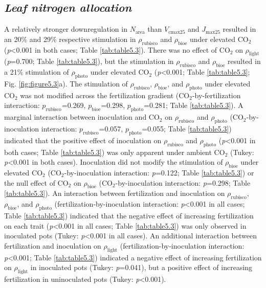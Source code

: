 \subsection{\textit{Leaf nitrogen allocation}}
\noindent A relatively stronger downregulation in $N_\mathrm{area}$ than $V_\mathrm{cmax25}$ and $J_\mathrm{max25}$ resulted in an 20\% and 29\% respective stimulation in $\rho_\mathrm{rubisco}$ and $\rho_\mathrm{bioe}$ under elevated CO$_2$ (\textit{p}<0.001 in both cases; Table \ref{tab:table5.3}). There was no effect of CO$_2$ on $\rho_\mathrm{light}$ (\textit{p}=0.700; Table \ref{tab:table5.3}), but the stimulation in $\rho_\mathrm{rubisco}$ and $\rho_\mathrm{bioe}$ resulted in a 21\% stimulation of $\rho_\mathrm{photo}$ under elevated CO$_2$ (\textit{p}<0.001; Table \ref{tab:table5.3}; Fig. \ref{fig:figure5.3}a). The stimulation of $\rho_\mathrm{rubisco}$, $\rho_\mathrm{bioe}$, and $\rho_\mathrm{photo}$ under elevated CO$_2$ was not modified across the fertilization gradient (CO$_2$-by-fertilization interaction: $p_\mathrm{rubisco}$=0.269, $p_\mathrm{bioe}$=0.298, $p_\mathrm{photo}$=0.281; Table \ref{tab:table5.3}). A marginal interaction between inoculation and CO$_2$ on $\rho_\mathrm{rubisco}$ and $\rho_\mathrm{photo}$ (CO$_2$-by-inoculation interaction: $p_\mathrm{rubisco}$=0.057, $p_\mathrm{photo}$=0.055; Table \ref{tab:table5.3}) indicated that the  positive effect of inoculation on $\rho_\mathrm{rubisco}$ and $\rho_\mathrm{photo}$ (\textit{p}<0.001 in both cases; Table \ref{tab:table5.3}) was only apparent under ambient CO$_2$ (Tukey: \textit{p}<0.001 in both cases). Inoculation did not modify the stimulation of $\rho_\mathrm{bioe}$ under elevated CO$_2$ (CO$_2$-by-inoculation interaction: \textit{p}=0.122; Table \ref{tab:table5.3}) or the null effect of CO$_2$ on $\rho_\mathrm{bioe}$ (CO$_2$-by-inoculation interaction: \textit{p}=0.298; Table \ref{tab:table5.3}). An interaction between fertilization and inoculation on $\rho_\mathrm{rubisco}$, $\rho_\mathrm{bioe}$, and $\rho_\mathrm{photo}$ (fertilization-by-inoculation interaction: \textit{p}<0.001 in all cases; Table \ref{tab:table5.3}) indicated that the negative effect of increasing fertilization on each trait (\textit{p}<0.001 in all cases; Table \ref{tab:table5.3}) was only observed in inoculated pots (Tukey: \textit{p}<0.001 in all cases). An additional interaction between fertilization and inoculation on $\rho_\mathrm{light}$ (fertilization-by-inoculation interaction: \textit{p}<0.001; Table \ref{tab:table5.3}) indicated a negative effect of increasing fertilization on $\rho_\mathrm{light}$ in inoculated pots (Tukey: \textit{p}=0.041), but a positive effect of increasing fertilization in uninoculated pots (Tukey: \textit{p}<0.001).


